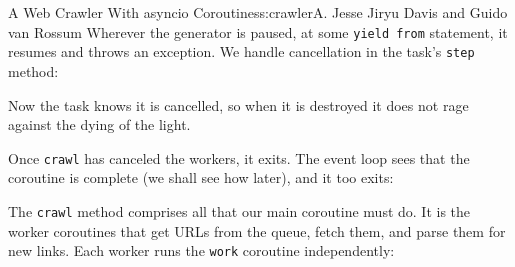 \begin{aosachapter}{A Web Crawler With asyncio Coroutines}{s:crawler}{A. Jesse Jiryu Davis and Guido van Rossum}
Wherever the generator is paused, at some \texttt{yield from} statement,
it resumes and throws an exception. We handle cancellation in the task's
\texttt{step} method:

\begin{Shaded}
\begin{Highlighting}[]
     
        \NormalTok{:}
         
         \NormalTok{:}

\end{Highlighting}
\end{Shaded}

Now the task knows it is cancelled, so when it is destroyed it does not
rage against the dying of the light.

Once \texttt{crawl} has canceled the workers, it exits. The event loop
sees that the coroutine is complete (we shall see how later), and it too
exits:

\begin{Shaded}
\begin{Highlighting}[]
\end{Highlighting}
\end{Shaded}

The \texttt{crawl} method comprises all that our main coroutine must do.
It is the worker coroutines that get URLs from the queue, fetch them,
and parse them for new links. Each worker runs the \texttt{work}
coroutine independently:

\begin{Shaded}
\begin{Highlighting}[]
     \NormalTok{):}
         \NormalTok{:}
              

              
\end{Highlighting}
\end{Shaded}


\end{aosachapter}
